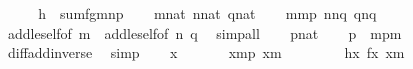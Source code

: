 \begin{isabellebody}
%
\isadelimproof
%
\endisadelimproof
%
\isatagproof
{}\isamarkupfalse%
\ {\isacharminus}{\kern0pt}\isanewline
\ \ \isamarkupfalse%
\ {\isacharquery}{\kern0pt}h\ {\isacharequal}{\kern0pt}\ {\isachardoublequoteopen}sum{\isacharparenleft}{\kern0pt}f{\isacharcomma}{\kern0pt}g{\isacharcomma}{\kern0pt}m{\isacharcomma}{\kern0pt}n{\isacharcomma}{\kern0pt}p{\isacharparenright}{\kern0pt}{\isachardoublequoteclose}\isanewline
\ \ \isamarkupfalse%
\ {\isacartoucheopen}m{\isasymin}nat{\isacartoucheclose}\ {\isacartoucheopen}n{\isasymin}nat{\isacartoucheclose}\ {\isacartoucheopen}q{\isasymin}nat{\isacartoucheclose}\isanewline
\ \ \isamarkupfalse%
\ {\isachardoublequoteopen}m{\isasymle}m{\isacharhash}{\kern0pt}{\isacharplus}{\kern0pt}p{\isachardoublequoteclose}\ {\isachardoublequoteopen}n{\isasymle}n{\isacharhash}{\kern0pt}{\isacharplus}{\kern0pt}q{\isachardoublequoteclose}\ {\isachardoublequoteopen}q{\isasymle}n{\isacharhash}{\kern0pt}{\isacharplus}{\kern0pt}q{\isachardoublequoteclose}\isanewline
\ \ \ \ \isamarkupfalse%
\ add{\isacharunderscore}{\kern0pt}le{\isacharunderscore}{\kern0pt}self{\isacharbrackleft}{\kern0pt}of\ m{\isacharbrackright}{\kern0pt}\ \ add{\isacharunderscore}{\kern0pt}le{\isacharunderscore}{\kern0pt}self{}{\isacharbrackleft}{\kern0pt}of\ n\ q{\isacharbrackright}{\kern0pt}\ \isamarkupfalse%
\ simp{\isacharunderscore}{\kern0pt}all\isanewline
\ \ \isamarkupfalse%
\ {\isacartoucheopen}p{\isasymin}nat{\isacartoucheclose}\isanewline
\ \ \isamarkupfalse%
\ {\isachardoublequoteopen}p\ {\isacharequal}{\kern0pt}\ {\isacharparenleft}{\kern0pt}m{\isacharhash}{\kern0pt}{\isacharplus}{\kern0pt}p{\isacharparenright}{\kern0pt}{\isacharhash}{\kern0pt}{\isacharminus}{\kern0pt}m{\isachardoublequoteclose}\ \isamarkupfalse%
\ diff{\isacharunderscore}{\kern0pt}add{\isacharunderscore}{\kern0pt}inverse{}\ \isamarkupfalse%
\ simp\isanewline
\ \ \isacommand{{\isacharbraceleft}{\kern0pt}}\isamarkupfalse%
\isamarkupfalse%
\ x\isanewline
\ \ \ \ \isamarkupfalse%
\ {}{\isacharcolon}{\kern0pt}\ {\isachardoublequoteopen}x{\isasymin}m{\isacharhash}{\kern0pt}{\isacharplus}{\kern0pt}p{\isachardoublequoteclose}\ {\isachardoublequoteopen}x{\isacharless}{\kern0pt}m{\isachardoublequoteclose}\isanewline
\ \ \ \ \isamarkupfalse%
\ {}\ \isamarkupfalse%
\ {\isachardoublequoteopen}{\isacharquery}{\kern0pt}h{\isacharbackquote}{\kern0pt}x{\isacharequal}{\kern0pt}\ f{\isacharbackquote}{\kern0pt}x{\isachardoublequoteclose}\ {\isachardoublequoteopen}x{\isasymin}m{\isachardoublequoteclose}\isanewline

\end{isabellebody}
